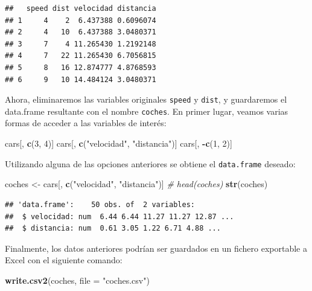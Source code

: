 \documentclass[
]{book}
\newenvironment{Shaded}{\begin{snugshade}}{\end{snugshade}}
\newcommand{\AttributeTok}[1]{\textcolor[rgb]{0.13,0.29,0.53}{#1}}
\newcommand{\CommentTok}[1]{\textcolor[rgb]{0.56,0.35,0.01}{\textit{#1}}}
\newcommand{\DecValTok}[1]{\textcolor[rgb]{0.00,0.00,0.81}{#1}}
\newcommand{\FunctionTok}[1]{\textcolor[rgb]{0.13,0.29,0.53}{\textbf{#1}}}
\newcommand{\NormalTok}[1]{#1}
\newcommand{\OtherTok}[1]{\textcolor[rgb]{0.56,0.35,0.01}{#1}}
\newcommand{\SpecialCharTok}[1]{\textcolor[rgb]{0.81,0.36,0.00}{\textbf{#1}}}
\newcommand{\StringTok}[1]{\textcolor[rgb]{0.31,0.60,0.02}{#1}}
\begin{document}
\begin{verbatim}
##   speed dist velocidad distancia
## 1     4    2  6.437388 0.6096074
## 2     4   10  6.437388 3.0480371
## 3     7    4 11.265430 1.2192148
## 4     7   22 11.265430 6.7056815
## 5     8   16 12.874777 4.8768593
## 6     9   10 14.484124 3.0480371
\end{verbatim}

Ahora, eliminaremos las variables originales \texttt{speed} y
\texttt{dist}, y guardaremos el data.frame resultante con el nombre \texttt{coches}.
En primer lugar, veamos varias formas de acceder a las variables de
interés:

\begin{Shaded}
\begin{Highlighting}[]
\NormalTok{cars[, }\FunctionTok{c}\NormalTok{(}\DecValTok{3}\NormalTok{, }\DecValTok{4}\NormalTok{)]}
\NormalTok{cars[, }\FunctionTok{c}\NormalTok{(}\StringTok{"velocidad"}\NormalTok{, }\StringTok{"distancia"}\NormalTok{)]}
\NormalTok{cars[, }\SpecialCharTok{{-}}\FunctionTok{c}\NormalTok{(}\DecValTok{1}\NormalTok{, }\DecValTok{2}\NormalTok{)]}
\end{Highlighting}
\end{Shaded}

Utilizando alguna de las opciones anteriores se obtiene el \texttt{data.frame}
deseado:

\begin{Shaded}
\begin{Highlighting}[]
\NormalTok{coches }\OtherTok{\textless{}{-}}\NormalTok{ cars[, }\FunctionTok{c}\NormalTok{(}\StringTok{"velocidad"}\NormalTok{, }\StringTok{"distancia"}\NormalTok{)]}
\CommentTok{\# head(coches)}
\FunctionTok{str}\NormalTok{(coches)}
\end{Highlighting}
\end{Shaded}

\begin{verbatim}
## 'data.frame':    50 obs. of  2 variables:
##  $ velocidad: num  6.44 6.44 11.27 11.27 12.87 ...
##  $ distancia: num  0.61 3.05 1.22 6.71 4.88 ...
\end{verbatim}

Finalmente, los datos anteriores podrían ser guardados en un fichero
exportable a Excel con el siguiente comando:

\begin{Shaded}
\begin{Highlighting}[]
\FunctionTok{write.csv2}\NormalTok{(coches, }\AttributeTok{file =} \StringTok{"coches.csv"}\NormalTok{)}
\end{Highlighting}
\end{Shaded}
\end{document}
